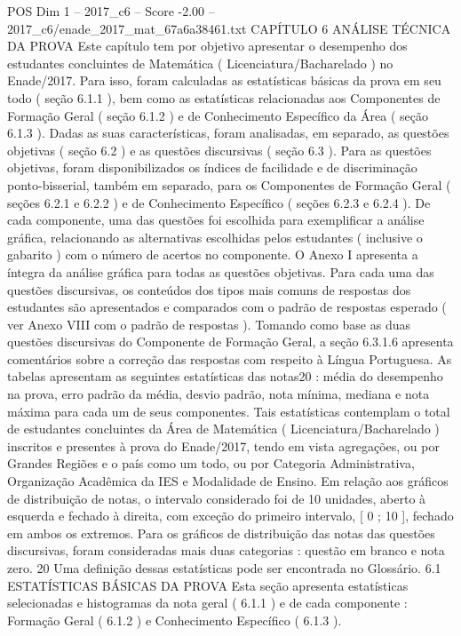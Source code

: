 \begin{textsample}{POS Dim 1 – 2017\_c6 – Score -2.00 – 2017\_c6/enade\_2017\_mat\_67a6a38461.txt}  \label{ex:f1_pos_294}
CAPÍTULO 6 ANÁLISE TÉCNICA DA PROVA Este capítulo tem por objetivo apresentar o desempenho dos estudantes concluintes de Matemática ( Licenciatura/Bacharelado ) no Enade/2017.
Para isso, foram calculadas as estatísticas básicas da prova em seu todo ( seção 6.1.1 ), bem como as estatísticas relacionadas aos Componentes de Formação Geral ( seção 6.1.2 ) e de Conhecimento Específico da Área ( seção 6.1.3 ).
Dadas as suas características, foram analisadas, em separado, as questões objetivas ( seção 6.2 ) e as questões discursivas ( seção 6.3 ).
Para as questões objetivas, foram disponibilizados os índices de facilidade e de discriminação ponto-bisserial, também em separado, para os Componentes de Formação Geral ( seções 6.2.1 e 6.2.2 ) e de Conhecimento Específico ( seções 6.2.3 e 6.2.4 ).
De cada componente, uma das questões foi escolhida para exemplificar a análise gráfica, relacionando as alternativas escolhidas pelos estudantes ( inclusive o gabarito ) com o número de acertos no componente.
O Anexo I apresenta a íntegra da análise gráfica para todas as questões objetivas.
Para cada uma das questões discursivas, os conteúdos dos tipos mais comuns de respostas dos estudantes são apresentados e comparados com o padrão de respostas esperado ( ver Anexo VIII com o padrão de respostas ).
Tomando como base as duas questões discursivas do Componente de Formação Geral, a seção 6.3.1.6 apresenta comentários sobre a correção das respostas com respeito à Língua Portuguesa.
As tabelas apresentam as seguintes estatísticas das notas20 : média do desempenho na prova, erro padrão da média, desvio padrão, nota mínima, mediana e nota máxima para cada um de seus componentes.
Tais estatísticas contemplam o total de estudantes concluintes da Área de Matemática ( Licenciatura/Bacharelado ) inscritos e presentes à prova do Enade/2017, tendo em vista agregações, ou por Grandes Regiões e o país como um todo, ou por Categoria Administrativa, Organização Acadêmica da IES e Modalidade de Ensino.
Em relação aos gráficos de distribuição de notas, o intervalo considerado foi de 10 unidades, aberto à esquerda e fechado à direita, com exceção do primeiro intervalo, [ 0 ; 10 ], fechado em ambos os extremos.
Para os gráficos de distribuição das notas das questões discursivas, foram consideradas mais duas categorias : questão em branco e nota zero. 20 Uma definição dessas estatísticas pode ser encontrada no Glossário. 6.1 ESTATÍSTICAS BÁSICAS DA PROVA Esta seção apresenta estatísticas selecionadas e histogramas da nota geral ( 6.1.1 ) e de cada componente : Formação Geral ( 6.1.2 ) e Conhecimento Específico ( 6.1.3 ).

\end{textsample}
